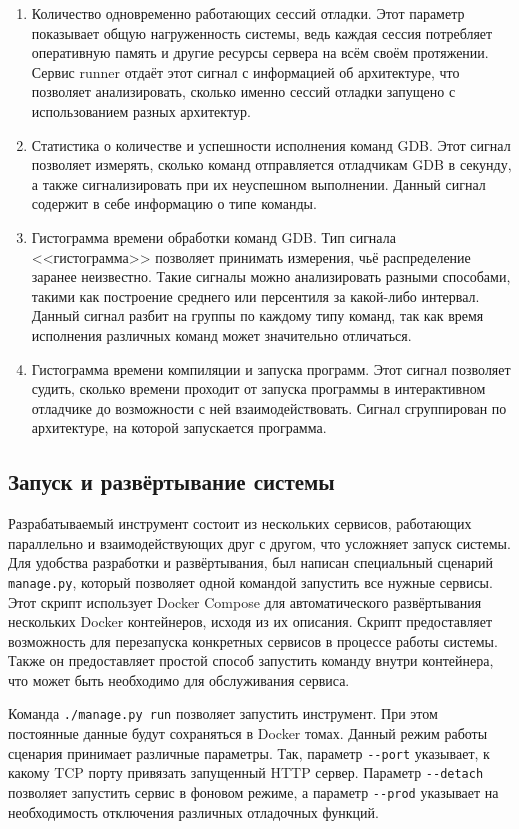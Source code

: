 \documentclass[a4paper,article,14pt]{extarticle}
\begin{document}
\begin{enumerate}
    \item Количество одновременно работающих сессий отладки. Этот параметр показывает общую нагруженность системы, ведь каждая сессия потребляет оперативную память и другие ресурсы сервера на всём своём протяжении. Сервис runner отдаёт этот сигнал с информацией об архитектуре, что позволяет анализировать, сколько именно сессий отладки запущено с использованием разных архитектур.
    \item Статистика о количестве и успешности исполнения команд GDB. Этот сигнал позволяет измерять, сколько команд отправляется отладчикам GDB в секунду, а также сигнализировать при их неуспешном выполнении. Данный сигнал содержит в себе информацию о типе команды.
    \item Гистограмма времени обработки команд GDB. Тип сигнала <<гистограмма>> позволяет принимать измерения, чьё распределение заранее неизвестно. Такие сигналы можно анализировать разными способами, такими как построение среднего или персентиля за какой-либо интервал. Данный сигнал разбит на группы по каждому типу команд, так как время исполнения различных команд может значительно отличаться.
    \item Гистограмма времени компиляции и запуска программ. Этот сигнал позволяет судить, сколько времени проходит от запуска программы в интерактивном отладчике до возможности с ней взаимодействовать. Сигнал сгруппирован по архитектуре, на которой запускается программа.
\end{enumerate}

\subsection{Запуск и развёртывание системы}

Разрабатываемый инструмент состоит из нескольких сервисов, работающих параллельно и взаимодействующих друг с другом, что усложняет запуск системы. Для удобства разработки и развёртывания, был написан специальный сценарий \texttt{manage.py}, который позволяет одной командой запустить все нужные сервисы. Этот скрипт использует Docker Compose\cite{dockercompose} для автоматического развёртывания нескольких Docker контейнеров, исходя из их описания. Скрипт предоставляет возможность для перезапуска конкретных сервисов в процессе работы системы. Также он предоставляет простой способ запустить команду внутри контейнера, что может быть необходимо для обслуживания сервиса.

Команда \texttt{./manage.py run} позволяет запустить инструмент. При этом постоянные данные будут сохраняться в Docker томах. Данный режим работы сценария принимает различные параметры. Так, параметр \texttt{-{}-port} указывает, к какому TCP порту привязать запущенный HTTP сервер. Параметр \texttt{-{}-detach} позволяет запустить сервис в фоновом режиме, а параметр \texttt{-{}-prod} указывает на необходимость отключения различных отладочных функций.
\end{document}
